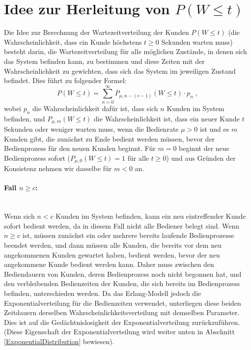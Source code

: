 \documentclass[a4paper,11pt,oneside]{article}
\theoremstyle{definition}
\begin{document}
\section[Idee zur Herleitung von P(W<=t)]{Idee zur Herleitung von $P(W\le t)$}

Die Idee zur Berechnung der Wartezeitverteilung der Kunden $P(W\le t)$ (die Wahrscheinlichkeit, dass ein Kunde höchstens $t\ge0$ Sekunden warten muss) besteht darin, die Wartezeitverteilung für alle möglichen Zustände, in denen sich das System befinden kann, zu bestimmen und diese Zeiten mit der Wahrscheinlichkeit zu gewichten, dass sich das System im jeweiligen Zustand befindet. Dies führt zu folgender Formel:
\begin{equation}\label{eq:WaitingTimeDistribution1}
P(W\le t)=\sum_{n=0}^\infty P_{\mu,n-(c-1)}(W\le t)\cdot p_n\;,
\end{equation}
wobei $p_n$ die Wahrscheinlichkeit dafür ist, dass sich $n$ Kunden im System befinden, und $P_{\mu,m}(W\le t)$ die Wahrscheinlichkeit ist, dass ein neuer Kunde $t$ Sekunden oder weniger warten muss, wenn die Bedienrate $\mu>0$ ist und es $m$ Kunden gibt, die zunächst zu Ende bedient werden müssen, bevor der Bedienprozess für den neuen Kunden beginnt. Für $m=0$ beginnt der neue Bedienprozess sofort ($P_{\mu,0}(W\le t)=1$ für alle $t\ge0$) und aus Gründen der Konsistenz nehmen wir dasselbe für $m<0$ an.

\paragraph{Fall $n\ge c$:}~\\
Wenn sich $n<c$ Kunden im System befinden, kann ein neu eintreffender Kunde sofort bedient werden, da in diesem Fall nicht alle Bediener belegt sind. Wenn $n\ge c$ ist, müssen zunächst ein oder mehrere bereits laufende Bedienprozesse beendet werden, und dann müssen alle Kunden, die bereits vor dem neu angekommenen Kunden gewartet haben, bedient werden, bevor der neu angekommene Kunde bedient werden kann. Daher muss zwischen den Bediendauern von Kunden, deren Bedienprozess noch nicht begonnen hat, und den verbleibenden Bedienzeiten der Kunden, die sich bereits im Bedienprozess befinden, unterschieden werden. Da das Erlang-Modell jedoch die Exponentialverteilung für die Bedienzeiten verwendet, unterliegen diese beiden Zeitdauern derselben Wahrscheinlichkeitsverteilung mit demselben Parameter. Dies ist auf die Gedächtnislosigkeit der Exponentialverteilung zurückzuführen. (Diese Eigenschaft der Exponentialverteilung wird weiter unten in Abschnitt \ref{ExponentialDistribution} bewiesen).
\end{document}
